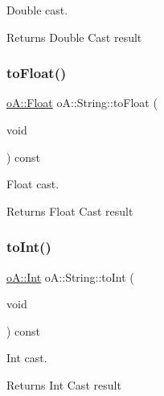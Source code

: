 Double cast. 

\begin{DoxyReturn}{Returns}
Double Cast result 
\end{DoxyReturn}
\mbox{\label{classo_a_1_1_string_a109668ec1795a27a5c44b33ec53e56a3}} 
\subsubsection{\texorpdfstring{to\+Float()}{toFloat()}}
{\footnotesize\ttfamily \mbox{\hyperlink{namespaceo_a_a513e9cb16924b482268ab3fcdf1f2499}{o\+A\+::\+Float}} o\+A\+::\+String\+::to\+Float (\begin{DoxyParamCaption}\item[{void}]{ }\end{DoxyParamCaption}) const}



Float cast. 

\begin{DoxyReturn}{Returns}
Float Cast result 
\end{DoxyReturn}
\mbox{\label{classo_a_1_1_string_a8aab531770e6d4abe2a3e85d55f69ead}} 
\subsubsection{\texorpdfstring{to\+Int()}{toInt()}}
{\footnotesize\ttfamily \mbox{\hyperlink{namespaceo_a_aa575525a7b0116822c73d43fa671a58c}{o\+A\+::\+Int}} o\+A\+::\+String\+::to\+Int (\begin{DoxyParamCaption}\item[{void}]{ }\end{DoxyParamCaption}) const}



Int cast. 

\begin{DoxyReturn}{Returns}
Int Cast result 
\end{DoxyReturn}
\mbox{\label{classo_a_1_1_string_a959f6a81bf2fa3e6fa001642608e2af2}} 
